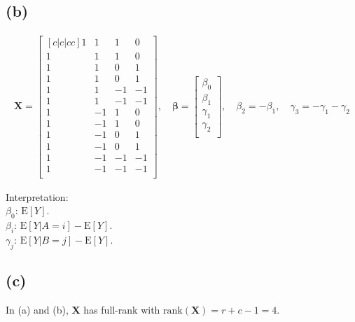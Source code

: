 \documentclass[a4paper]{article}
\newcommand{\E}{\mathrm{E}}
\begin{document}
\subsection{(b)}
\begin{align*}
\bm{X} = 
\begin{bmatrix}[c|c|cc]
1 & 1 & 1 & 0\\
1 & 1 & 1 & 0\\
1 & 1 & 0 & 1\\
1 & 1 & 0 & 1\\
1 & 1 & -1 & -1\\
1 & 1 & -1 & -1\\
\hline
1 & -1 & 1 & 0\\
1 & -1 & 1 & 0\\
1 & -1 & 0 & 1\\
1 & -1 & 0 & 1\\
1 & -1 & -1 & -1\\
1 & -1 & -1 & -1\\
\end{bmatrix}
, \quad
\bm{\beta} =
\begin{bmatrix}
\beta_{0}\\
\beta_{1}\\
\gamma_{1}\\
\gamma_{2}\\
\end{bmatrix}
, \quad
\beta_{2} = -\beta_{1}
, \quad
\gamma_{3} = -\gamma_{1} -\gamma_{2}
\end{align*}

Interpretation:\\
$\beta_0$: $\E\left[Y\right]$.\\
$\beta_{i}$: $\E\left[Y|A = i\right] - \E\left[Y\right]$.\\
$\gamma_{j}$: $\E\left[Y|B = j\right] - \E\left[Y\right]$.\\

\subsection{(c)}
In (a) and (b), $\bm{X}$ has full-rank with $\mathrm{rank}(\bm{X}) = r+c-1 = 4$.

\vspace{\baselineskip}
\end{document}
